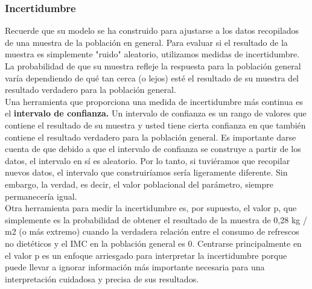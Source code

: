 \documentclass[10pt]{book}
\begin{document}
	    \subsubsection{Incertidumbre}
	    Recuerde que su modelo se ha construido para ajustarse a los datos recopilados de una muestra de la población en general. Para evaluar si el resultado de la muestra es simplemente "ruido" aleatorio, utilizamos medidas de incertidumbre. La probabilidad de que su muestra refleje la respuesta para la población general varía dependiendo de qué tan cerca (o lejos) esté el resultado de su muestra del resultado verdadero para la población general. \\
	    Una herramienta que proporciona una medida de incertidumbre más continua es el \textbf{intervalo de confianza.} Un intervalo de confianza es un rango de valores que contiene el resultado de su muestra y usted tiene cierta confianza en que también contiene el resultado verdadero para la población general. Es importante darse cuenta de que debido a que el intervalo de confianza se construye a partir de los datos, el intervalo en sí es aleatorio. Por lo tanto, si tuviéramos que recopilar nuevos datos, el intervalo que construiríamos sería ligeramente diferente. Sin embargo, la verdad, es decir, el valor poblacional del parámetro, siempre permanecería igual. \\
	    Otra herramienta para medir la incertidumbre es, por supuesto, el valor p, que simplemente es la probabilidad de obtener el resultado de la muestra de 0,28 kg / m2 (o más extremo) cuando la verdadera relación entre el consumo de refrescos no dietéticos y el IMC en la población general es 0.  Centrarse principalmente en el valor p es un enfoque arriesgado para interpretar la incertidumbre porque puede llevar a ignorar información más importante necesaria para una interpretación cuidadosa y precisa de sus resultados. 
\end{document}
